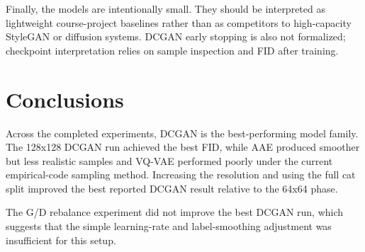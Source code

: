 \documentclass[11pt,a4paper]{article}
\begin{document}
Finally, the models are intentionally small. They should be interpreted as lightweight course-project baselines rather than as competitors to high-capacity StyleGAN or diffusion systems. DCGAN early stopping is also not formalized; checkpoint interpretation relies on sample inspection and FID after training.

\section{Conclusions}

Across the completed experiments, DCGAN is the best-performing model family. The 128x128 DCGAN run achieved the best FID, while AAE produced smoother but less realistic samples and VQ-VAE performed poorly under the current empirical-code sampling method. Increasing the resolution and using the full cat split improved the best reported DCGAN result relative to the 64x64 phase.

The G/D rebalance experiment did not improve the best DCGAN run, which suggests that the simple learning-rate and label-smoothing adjustment was insufficient for this setup.



\end{document}
